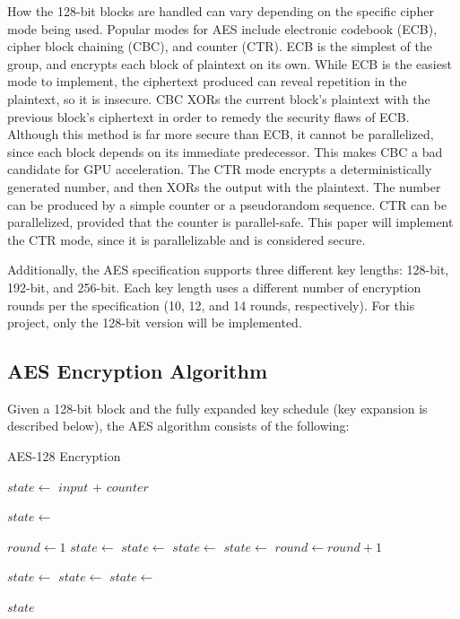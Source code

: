 \documentclass[a4paper,10pt]{article}
\begin{document}
How the 128-bit blocks are handled can vary depending on the specific cipher mode being used.  Popular modes for AES include electronic codebook (ECB), cipher block chaining (CBC), and counter (CTR)\cite{intel}.  ECB is the simplest of the group, and encrypts each block of plaintext on its own.  While ECB is the easiest mode to implement, the ciphertext produced can reveal repetition in the plaintext, so it is insecure.  CBC XORs the current block's plaintext with the previous block's ciphertext in order to remedy the security flaws of ECB.  Although this method is far more secure than ECB, it cannot be parallelized, since each block depends on its immediate predecessor.  This makes CBC a bad candidate for GPU acceleration.  The CTR mode encrypts a deterministically generated number, and then XORs the output with the plaintext.  The number can be produced by a simple counter or a pseudorandom sequence.  CTR can be parallelized, provided that the counter is parallel-safe.    This paper will implement the CTR mode, since it is parallelizable and is considered secure\cite{schneier}.

Additionally, the AES specification supports three different key lengths: 128-bit, 192-bit, and 256-bit.  Each key length uses a different number of encryption rounds per the specification (10, 12, and 14 rounds, respectively).  For this project, only the 128-bit version will be implemented.

\subsection{AES Encryption Algorithm}

Given a 128-bit block and the fully expanded key schedule (key expansion is described below), the AES algorithm consists of the following\cite{nist}:

\begin{algorithm}
\caption{AES-128 Encryption}
\begin{algorithmic}[1]

\State $state\gets$ $input$ + $counter$

\State $state\gets$ 

\State $round\gets 1$
    \State $state\gets$ 
    \State $state\gets$ 
    \State $state\gets$ 
    \State $state\gets$ 
    \State $round\gets round + 1$
\EndWhile

\State $state\gets$ 
\State $state\gets$ 
\State $state\gets$ 

\State \Return $state$
\EndFunction
\end{algorithmic}
\end{algorithm}
\end{document}
